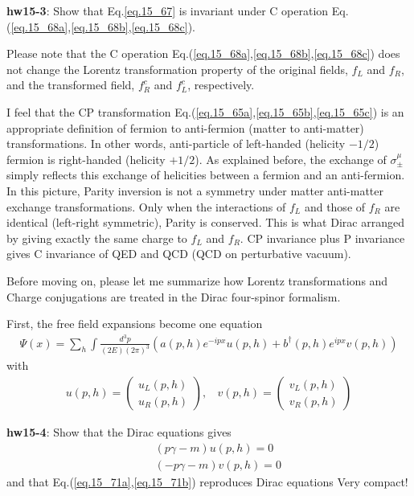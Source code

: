 \documentclass[12pt]{article}
\begin{document}
{{\bf hw15-3}: Show that Eq.\ref{eq.15_67} is invariant under C operation Eq.(\ref{eq.15_68a},\ref{eq.15_68b},\ref{eq.15_68c}).

  Please note that the C operation Eq.(\ref{eq.15_68a},\ref{eq.15_68b},\ref{eq.15_68c}) does not change the Lorentz transformation property of the original fields, $f_L$ and $f_R$, and the transformed field, $f_R^c$ and $f_L^c$, respectively.

  I feel that the CP transformation Eq.(\ref{eq.15_65a},\ref{eq.15_65b},\ref{eq.15_65c}) is an appropriate definition of fermion to anti-fermion (matter to anti-matter) transformations.  In other words, anti-particle of left-handed (helicity $-1/2$) fermion is
  right-handed (helicity $+1/2$). As explained before, the exchange of
  $\sigma_\pm^\mu$ simply reflects this exchange of helicities between a
  fermion and an anti-fermion. In this picture, Parity inversion is not
  a symmetry under matter anti-matter exchange transformations. Only
  when the interactions of $f_L$ and those of $f_R$ are identical (left-right
  symmetric), Parity is conserved. This is what Dirac arranged by giving
  exactly the same charge to $f_L$ and $f_R$. CP invariance plus P invariance
  gives C invariance of QED and QCD (QCD on perturbative vacuum).

  Before moving on, please let me summarize how Lorentz transformations
  and Charge conjugations are treated in the Dirac four-spinor formalism.

  First, the free field expansions %
  become one equation
\begin{eqnarray}
  \Psi(x)
  = \sum_h \int \frac{d^3p}{(2E)(2\pi)^3}(a(p,h) e^{-ipx} u(p,h) + b^\dagger(p,h) e^{ipx} v(p,h)) \label{eq.15_69}
\end{eqnarray}
  with
\begin{eqnarray}
  u(p,h) =
  \begin{pmatrix}
    u_L(p,h) \\ u_R(p,h)
  \end{pmatrix}
  ,~~~~v(p,h) =
  \begin{pmatrix}
    v_L(p,h) \\ v_R(p,h)
  \end{pmatrix} \label{eq.15_70}
\end{eqnarray}

{\bf hw15-4}: Show that the Dirac equations %
gives
\begin{eqnarray}
  && (  p\gamma -m ) u(p,h) = 0 \label{eq.15_71a} \\
  && ( -p\gamma -m)  v(p,h) = 0 \label{eq.15_71b}
\end{eqnarray}
  and that Eq.(\ref{eq.15_71a},\ref{eq.15_71b}) reproduces Dirac equations %
  Very compact!

}
\end{document}
